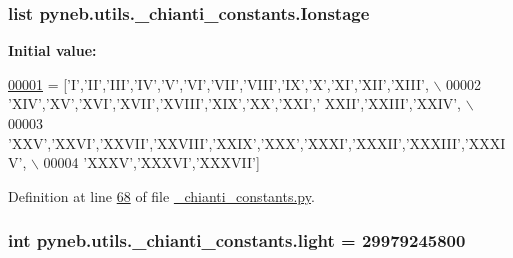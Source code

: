 \hypertarget{namespacepyneb_1_1utils_1_1__chianti__constants_a21256617e8a01b45a8d911c01fd8f6fa}{
\subsubsection[{Ionstage}]{\setlength{\rightskip}{0pt plus 5cm}list pyneb.\-utils.\-\_\-chianti\-\_\-constants.\-Ionstage}}\label{namespacepyneb_1_1utils_1_1__chianti__constants_a21256617e8a01b45a8d911c01fd8f6fa}
{\bfseries Initial value\-:}
\begin{DoxyCode}
\hypertarget{namespacepyneb_1_1utils_1_1__chianti__constants_l00001}{}\hyperlink{namespacepyneb_1_1utils_1_1__chianti__constants}{00001} = [\textcolor{stringliteral}{'I'},\textcolor{stringliteral}{'II'},\textcolor{stringliteral}{'III'},\textcolor{stringliteral}{'IV'},\textcolor{stringliteral}{'V'},\textcolor{stringliteral}{'VI'},\textcolor{stringliteral}{'VII'},\textcolor{stringliteral}{'VIII'},\textcolor{stringliteral}{'IX'},\textcolor{stringliteral}{'X'},\textcolor{stringliteral}{'XI'},\textcolor{stringliteral}{'XII'},\textcolor{stringliteral}{'XIII'}, \(\backslash\)
00002     \textcolor{stringliteral}{'XIV'},\textcolor{stringliteral}{'XV'},\textcolor{stringliteral}{'XVI'},\textcolor{stringliteral}{'XVII'},\textcolor{stringliteral}{'XVIII'},\textcolor{stringliteral}{'XIX'},\textcolor{stringliteral}{'XX'},\textcolor{stringliteral}{'XXI'},\textcolor{stringliteral}{' XXII'},\textcolor{stringliteral}{'XXIII'},\textcolor{stringliteral}{'XXIV'}, \(\backslash\)
00003     \textcolor{stringliteral}{'XXV'},\textcolor{stringliteral}{'XXVI'},\textcolor{stringliteral}{'XXVII'},\textcolor{stringliteral}{'XXVIII'},\textcolor{stringliteral}{'XXIX'},\textcolor{stringliteral}{'XXX'},\textcolor{stringliteral}{'XXXI'},\textcolor{stringliteral}{'XXXII'},\textcolor{stringliteral}{'XXXIII'},\textcolor{stringliteral}{'XXXIV'}, \(\backslash\)
00004     \textcolor{stringliteral}{'XXXV'},\textcolor{stringliteral}{'XXXVI'},\textcolor{stringliteral}{'XXXVII'}]
\end{DoxyCode}


Definition at line \hyperlink{__chianti__constants_8py_source_l00068}{68} of file \hyperlink{__chianti__constants_8py_source}{\-\_\-chianti\-\_\-constants.\-py}.

\hypertarget{namespacepyneb_1_1utils_1_1__chianti__constants_a5c6837147cfe0f07141bf1566944dd9e}{
\subsubsection[{light}]{\setlength{\rightskip}{0pt plus 5cm}int pyneb.\-utils.\-\_\-chianti\-\_\-constants.\-light = 29979245800}}\label{namespacepyneb_1_1utils_1_1__chianti__constants_a5c6837147cfe0f07141bf1566944dd9e}



